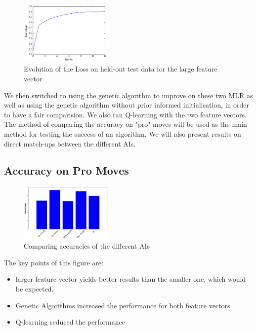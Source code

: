 \documentclass[11pt]{article}
\begin{document}
\begin{figure}[H]
\begin{center}
    \includegraphics[width=0.4\textwidth]{acc_large.png}
\end{center}
\caption{Evolution of the Loss on held-out test data for the large feature vector}
\end{figure}

\noindent We then switched to using the genetic algorithm to improve on these two MLR as well as using the genetic algorithm without prior informed initialisation, in order to have a fair comparision. We also ran Q-learning with the two feature vectors.\\

\noindent The method of comparing the accuracy on "pro" moves will be used as the main method for testing the success of an algorithm. We will also present results on direct match-ups between the different AIs.
 
\subsection{Accuracy on Pro Moves}

\begin{figure}[H]
\begin{center}
    \includegraphics[width=0.4\textwidth]{acc.png}
\end{center}
\caption{Comparing accuracies of the different AIs}
\end{figure}
The key points of this figure are:
\begin{itemize}
\item larger feature vector yields better results than the smaller one, which would be expected. 
\item Genetic Algorithms increased the performance for both feature vectors
\item Q-learning reduced the performance
\end{itemize}
\end{document}
